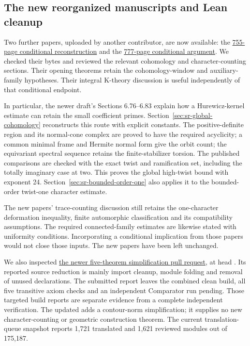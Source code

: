 \subsection{The new reorganized manuscripts and Lean cleanup}
Two further papers, uploaded by another contributor, are now available:
the
\href{https://principia-math.com/api/ws/files/ae360903d3e2eb839b7c461ff43c4a94}{755-page conditional reconstruction}
and the
\href{https://principia-math.com/api/ws/files/8c527eb7a1dbba0b1dc69c2ba0e60db0}{777-page conditional argument}.
We checked their bytes and reviewed the relevant cohomology and
character-counting sections. Their opening theorems retain the
cohomology-window and auxiliary-family hypotheses.
Their integral K-theory discussion is useful independently of that
conditional endpoint.

In particular, the newer draft's Sections 6.76--6.83 explain how a
Hurewicz-kernel estimate can retain the small coefficient primes.
Section~\ref{sec:sr-global-cohomology} reconstructs this route with
explicit constants. The positive-definite region and its normal-cone
complex are proved to have the required acyclicity; a common minimal
frame and Hermite normal form give the orbit count; the equivariant
spectral sequence retains the finite-stabilizer torsion.
The published comparisons are checked with the exact twist and
ramification set, including the totally imaginary case at two.
This proves the global high-twist bound with exponent 24.
Section~\ref{sec:sr-bounded-order-one} also applies it to the
bounded-order twist-one character estimate.

The new papers' trace-counting discussion still retains the
one-character deformation inequality, finite automorphic
classification and its compatibility assumptions.
The required connected-family estimates are likewise stated with
uniformity conditions. Incorporating a conditional implication from
those papers would not close those inputs.
The new papers have been left unchanged.

We also inspected
\href{https://github.com/leanprover-community/riemann-hypothesis/pull/44}{the newer five-theorem simplification pull request},
at head .
Its reported source reduction is mainly import cleanup, module folding
and removal of unused declarations.
The submitted report leaves the combined clean  build,
all five transitive axiom checks and an independent Comparator run
pending. Those targeted build reports are separate evidence from
a complete independent verification.
The updated  adds a contour-norm
simplification; it supplies no new character-counting or geometric
construction theorem.
The current translation-queue snapshot reports 1,721 translated and
1,621 reviewed modules out of 175,187.

